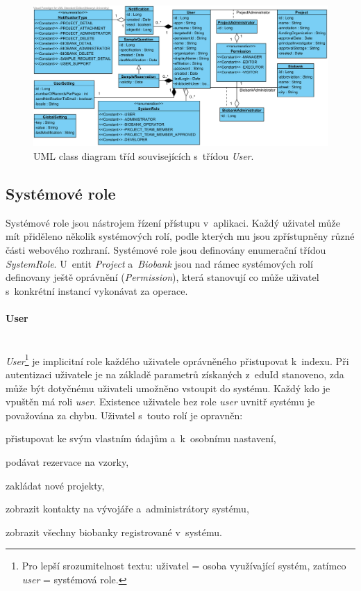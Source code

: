 \documentclass[11pt, draft, oneside]{fithesis2}
\newcommand{\paragraphNewLine}[1]{\paragraph*{#1}\mbox{}\\}
\begin{document}
\begin{figure}[h!]
\begin{center}
	\includegraphics[width=\textwidth]{UserView}
\caption{UML class diagram tříd souvisejících s~třídou \textit{User}.}
\label{fig:index:uml:class:user}
\end{center}
\end{figure}

\subsection{Systémové role}
Systémové role jsou nástrojem řízení přístupu v~aplikaci. Každý uživatel může mít přiděleno několik systémových rolí, podle kterých mu jsou zpřístupněny různé části webového rozhraní. Systémové role jsou definovány enumerační třídou \textit{SystemRole}. 
U~entit \textit{Project} a~\textit{Biobank} jsou nad rámec systémových rolí definovany ještě oprávnění (\textit{Permission}), která stanovují co může uživatel s~konkrétní instancí vykonávat za operace.

\paragraphNewLine{User}
\textit{User}\footnote{Pro lepší srozumitelnost textu: uživatel = osoba využívající systém, zatímco \textit{user} = systémová role.} je implicitní role každého uživatele oprávněného přistupovat k~indexu. Při autentizaci uživatele je na základě parametrů získaných z~eduId stanoveno, zda může být dotyčnému uživateli umožněno vstoupit do systému. Každý kdo je vpuštěn má roli \textit{user}. Existence uživatele bez role \textit{user} uvnitř systému je považována za chybu.
Uživatel s~touto rolí je opravněn:
\begin{compactitem}
	\item přistupovat ke svým vlastním údajům a~k~osobnímu nastavení,
	\item podávat rezervace na vzorky,
	\item zakládat nové projekty,
	\item zobrazit kontakty na vývojáře a~administrátory systému,
	\item zobrazit všechny biobanky registrované v~systému.
\end{compactitem}
\end{document}
